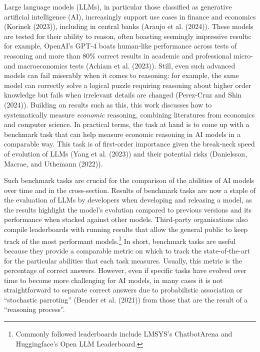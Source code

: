 \documentclass[
]{article}
\begin{document}
Large language models (LLMs), in particular those classified as
generative artificial intelligence (AI), increasingly support use cases
in finance and economics (Korinek (2023)), including in central banks
(Araujo et al. (2024)). These models are tested for their ability to
reason, often boasting seemingly impressive results: for example,
OpenAI's GPT-4 boats human-like performance across tests of reasoning
and more than 80\% correct results in academic and professional micro-
and macroeconomics tests (Achiam et al. (2023)). Still, even such
advanced models can fail miserably when it comes to reasoning: for
example, the same model can correctly solve a logical puzzle requiring
reasoning about higher order knowledge but fails when irrelevant details
are changed (Perez-Cruz and Shin (2024)). Building on results such as
this, this work discusses how to systematically measure \emph{economic}
reasoning, combining literatures from economics and computer science. In
practical terms, the task at hand is to come up with a benchmark task
that can help measure economic reasoning in AI models in a comparable
way. This task is of first-order importance given the break-neck speed
of evolution of LLMs (Yang et al. (2023)) and their potential risks
(Danielsson, Macrae, and Uthemann (2022)).

Such benchmark tasks are crucial for the comparison of the abilities of
AI models over time and in the cross-section. Results of benchmark tasks
are now a staple of the evaluation of LLMs by developers when developing
and releasing a model, as the results highlight the model's evolution
compared to previous versions and its performance when stacked against
other models. Third-party organisations also compile leaderboards with
running results that allow the general public to keep track of the most
performant models.\footnote{Commonly followed leaderboards include
  LMSYS's ChatbotArena and Huggingface's Open LLM Leaderboard.} In
short, benchmark tasks are useful because they provide a comparable
metric on which to track the state-of-the-art for the particular
abilities that each task measures. Usually, this metric is the
percentage of correct answers. However, even if specific tasks have
evolved over time to become more challenging for AI models, in many
cases it is not straightforward to separate correct answers due to
probabilistic association or ``stochastic parroting'' (Bender et al.
(2021)) from those that are the result of a ``reasoning process''.
\end{document}

